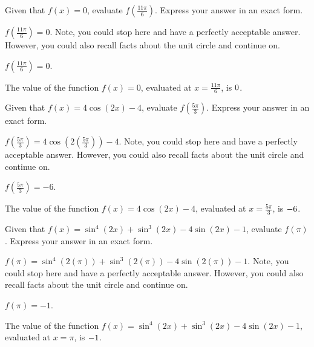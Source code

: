 \begin{shuffle}
\begin{exercise}
Given that $f(x)=0$, evaluate $f(\frac{11 \pi }{6})$. Express your answer in an exact form.
\begin{solution}
\begin{hint}
$f(\frac{11 \pi }{6})=0$. Note, you could stop here and have a perfectly acceptable answer. However, you could also recall facts about the unit circle and continue on. 
\end{hint}
\begin{hint}
$f(\frac{11 \pi }{6})=0$.
\end{hint}
The value of the function $f(x) = 0$, evaluated at $x=\frac{11 \pi }{6}$, is ${0}$.
\end{solution}
\end{exercise}

\begin{exercise}
Given that $f(x)=4 \cos (2 x)-4$, evaluate $f(\frac{5 \pi }{3})$. Express your answer in an exact form.
\begin{solution}
\begin{hint}
$f(\frac{5 \pi }{3})=4 \cos (2 (\frac{5 \pi }{3}))-4$. Note, you could stop here and have a perfectly acceptable answer. However, you could also recall facts about the unit circle and continue on. 
\end{hint}
\begin{hint}
$f(\frac{5 \pi }{3})=-6$.
\end{hint}
The value of the function $f(x) = 4 \cos (2 x)-4$, evaluated at $x=\frac{5 \pi }{3}$, is ${-6}$.
\end{solution}
\end{exercise}

\begin{exercise}
Given that $f(x)=\sin ^4(2 x)+\sin ^3(2 x)-4 \sin (2 x)-1$, evaluate $f(\pi)$. Express your answer in an exact form.
\begin{solution}
\begin{hint}
$f(\pi)=\sin ^4(2 (\pi))+\sin ^3(2 (\pi))-4 \sin (2 (\pi))-1$. Note, you could stop here and have a perfectly acceptable answer. However, you could also recall facts about the unit circle and continue on. 
\end{hint}
\begin{hint}
$f(\pi)=-1$.
\end{hint}
The value of the function $f(x) = \sin ^4(2 x)+\sin ^3(2 x)-4 \sin (2 x)-1$, evaluated at $x=\pi$, is ${-1}$.
\end{solution}
\end{exercise}


\end{shuffle}

